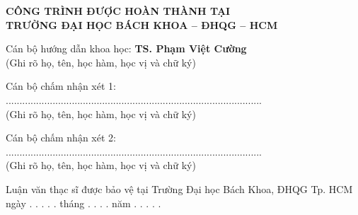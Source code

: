

\thispagestyle{empty}

\begin{center}
{\fontsize{14}{16}\selectfont\bfseries
CÔNG TRÌNH ĐƯỢC HOÀN THÀNH TẠI\\
TRƯỜNG ĐẠI HỌC BÁCH KHOA -- ĐHQG -- HCM\\
}
\end{center}

\vspace{1.5cm}

{\fontsize{13}{15}\selectfont
Cán bộ hướng dẫn khoa học: \textbf{TS. Phạm Việt Cường}\\
\vspace{0.3cm}
\hspace{5cm}(Ghi rõ họ, tên, học hàm, học vị và chữ ký)\\
}

{\fontsize{13}{15}\selectfont
Cán bộ chấm nhận xét 1: .............................................................................................\\
\vspace{0.3cm}
\hspace{5cm}(Ghi rõ họ, tên, học hàm, học vị và chữ ký)\\
}

{\fontsize{13}{15}\selectfont
Cán bộ chấm nhận xét 2: .............................................................................................\\
\vspace{0.3cm}
\hspace{5cm}(Ghi rõ họ, tên, học hàm, học vị và chữ ký)\\
}

{\fontsize{13}{15}\selectfont
Luận văn thạc sĩ được bảo vệ tại Trường Đại học Bách Khoa, ĐHQG Tp. HCM\\
ngày . . . . . tháng . . . . năm . . . . .\\
}

\vspace{0.5cm}

